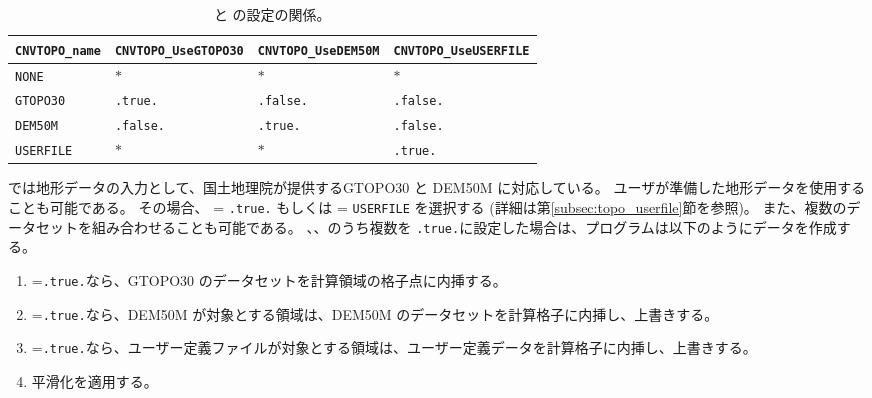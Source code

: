 \begin{table}[tbh]
\begin{center}
\caption{ と  の設定の関係。}
\begin{tabularx}{150mm}{l|l|l|l} \hline
  \rowcolor[gray]{0.9} \verb|CNVTOPO_name|   & \verb|CNVTOPO_UseGTOPO30| & \verb|CNVTOPO_UseDEM50M| & \verb|CNVTOPO_UseUSERFILE| \\ \hline
                       \verb|NONE|           & $\ast$         & $\ast$         & $\ast$          \\ \hline
                       \verb|GTOPO30|        & \verb|.true.|  & \verb|.false.| & \verb|.false.|  \\ \hline
                       \verb|DEM50M|         & \verb|.false.| & \verb|.true.|  & \verb|.false.|  \\ \hline
                       \verb|USERFILE|       & $\ast$         & $\ast$         & \verb|.true.|   \\ \hline
\end{tabularx}
\label{tab:cvntopo_name}
\end{center}
\end{table}


\scalerm では地形データの入力として、国土地理院が提供するGTOPO30 と DEM50M に対応している。
ユーザが準備した地形データを使用することも可能である。
その場合、 = \verb|.true.| もしくは  = \verb|USERFILE| を選択する
(詳細は第\ref{subsec:topo_userfile}節を参照)。
また、複数のデータセットを組み合わせることも可能である。
、、のうち複数を
\verb|.true.|に設定した場合は、プログラムは以下のようにデータを作成する。
\begin{enumerate}[1)]
 \item {}=\verb|.true.|なら、GTOPO30 のデータセットを計算領域の格子点に内挿する。
 \item {}=\verb|.true.|なら、DEM50M が対象とする領域は、DEM50M のデータセットを計算格子に内挿し、上書きする。
 \item {}=\verb|.true.|なら、ユーザー定義ファイルが対象とする領域は、ユーザー定義データを計算格子に内挿し、上書きする。
 \item 平滑化を適用する。
\end{enumerate}


